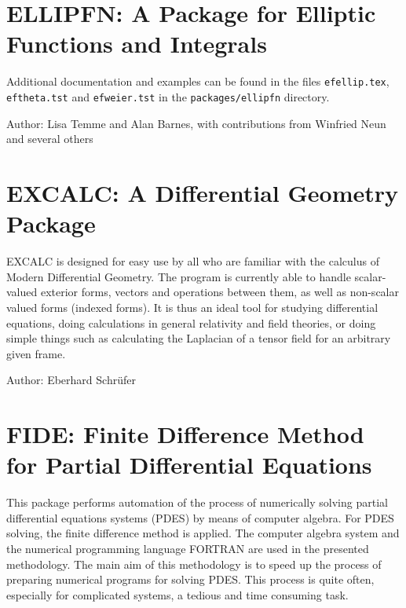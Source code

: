 \section{ELLIPFN: A Package for Elliptic Functions and Integrals}

Additional documentation and examples can
be found in the files \texttt{efellip.tex}, \texttt{eftheta.tst} and
\texttt{efweier.tst} in the \texttt{packages/ellipfn} directory.

Author: Lisa Temme and Alan Barnes, with contributions from Winfried Neun
and several others



\newpage

\section{EXCALC: A Differential Geometry Package}
\label{package:EXCALC}

EXCALC is designed for easy use by all who are familiar with the calculus
of Modern Differential Geometry. The program is currently able to handle
scalar-valued exterior forms, vectors and operations between them, as well
as non-scalar valued forms (indexed forms). It is thus an ideal tool for
studying differential equations, doing calculations in general relativity
and field theories, or doing simple things such as calculating the
Laplacian of a tensor field for an arbitrary given frame.

Author: Eberhard Schr\"ufer



\newpage

\section{FIDE: Finite Difference Method for Partial Differential Equations}

This package performs  automation of  the process of numerically
solving  partial  differential  equations  systems  (PDES)  by  means of
computer algebra.  For PDES solving, the finite difference method is applied.
The  computer  algebra  system  \REDUCE  and  the  numerical  programming
language FORTRAN  are used in the presented methodology. The main aim of
this methodology is to speed up the process of preparing numerical
programs for  solving PDES.  This process is quite often, especially for
complicated systems, a tedious and time consuming task.

